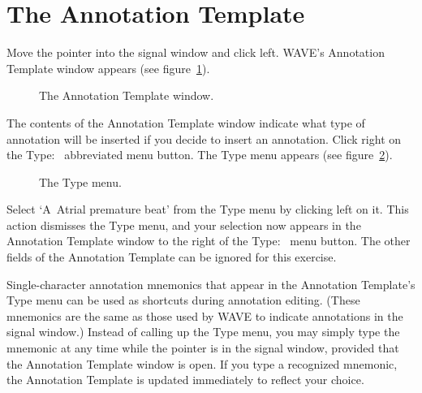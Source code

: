 \documentclass[twoside]{book}
\newcommand{\keycap}[1]{\cornersize{.5}\Ovalbox{\small\sf #1}}
\newcommand{\amenubutton}[1]{{\sf #1}~\keycap{\ensuremath{\nabla}}}
\newcommand{\WAVE}{{\sf WAVE}\xspace}
\begin{document}
\section{The {\sf Annotation Template}}
Move the pointer into the signal window and click left.  \WAVE{}'s
{\sf Annotation Template} window appears (see
figure~\ref{fig:annotation-template}).
\begin{figure}
\centerline{}
\caption{The {\sf Annotation Template} window.}
\begin{htmlonly}
\end{htmlonly}
\begin{latexonly}
\end{latexonly}
\label{fig:annotation-template}
\end{figure}
The contents of the {\sf Annotation Template} window indicate what
type of annotation will be inserted if you decide to insert an
annotation.  Click right on the \amenubutton{Type:} abbreviated
menu button.  The {\sf Type} menu
appears (see figure~\ref{fig:type-menu}).
\begin{figure}
\centerline{}
\caption{The {\sf Type} menu.}
\label{fig:type-menu}
\begin{htmlonly}
\end{htmlonly}
\begin{latexonly}
\end{latexonly}
\end{figure}
Select `{\sf A~Atrial premature beat}' from the {\sf Type} menu by
clicking left on it.  This action dismisses the {\sf Type} menu, and
your selection now appears in the {\sf Annotation Template} window to
the right of the \amenubutton{Type:} menu button.  The other
fields of the {\sf Annotation Template} can be ignored for this exercise.

Single-character annotation mnemonics
that appear in the {\sf Annotation Template}'s {\sf Type} menu
can be used as shortcuts 
during annotation editing.  (These mnemonics are the same as those used by
\WAVE{} to indicate annotations in the signal window.)  Instead of
calling up the {\sf Type} menu, you may
simply type the mnemonic at any time while the pointer is in the
signal window, provided that the {\sf Annotation Template} window is open.
If you type a recognized mnemonic, the {\sf Annotation Template} is updated
immediately to reflect your choice.
\end{document}

